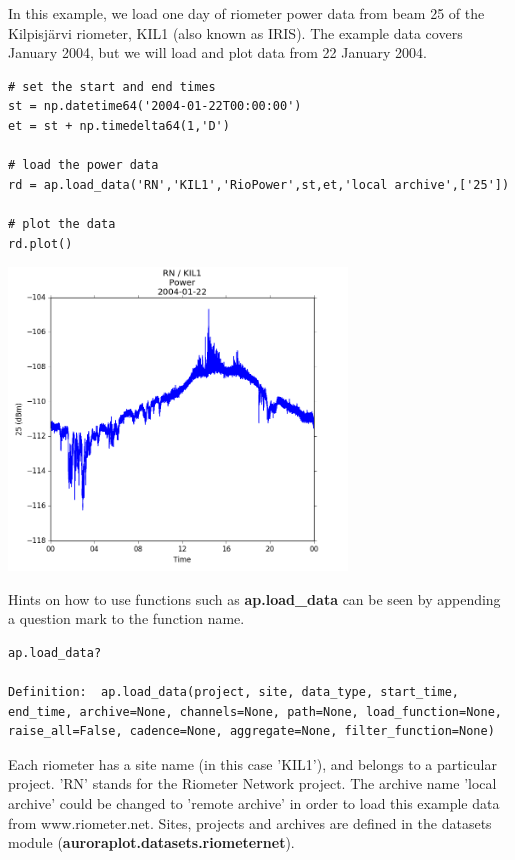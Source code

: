 \documentclass{article}
\begin{document}
In this example, we load one day of riometer power data from beam 25 of the Kilpisj\"arvi riometer, KIL1 (also known as IRIS). The example data covers January 2004, but we will load and plot data from 22 January 2004.

\begin{lstlisting}[style=pythonstyle]
# set the start and end times
st = np.datetime64('2004-01-22T00:00:00')
et = st + np.timedelta64(1,'D')

# load the power data
rd = ap.load_data('RN','KIL1','RioPower',st,et,'local archive',['25'])

# plot the data
rd.plot()
\end{lstlisting}

\begin{center}
\includegraphics[width=9cm]{images/figure_1.png}
\end{center}

\noindent Hints on how to use functions such as {\bf ap.load\_data} can be seen by appending a question mark to the function name.

\begin{lstlisting}[style=pythonstyle]
ap.load_data?

Definition:  ap.load_data(project, site, data_type, start_time, end_time, archive=None, channels=None, path=None, load_function=None, raise_all=False, cadence=None, aggregate=None, filter_function=None)
\end{lstlisting}

Each riometer has a site name (in this case 'KIL1'), and belongs to a particular project. 'RN' stands for the Riometer Network project. The archive name 'local archive' could be changed to 'remote archive' in order to load this example data from www.riometer.net. Sites, projects and archives are defined in the datasets module ({\bf auroraplot.datasets.riometernet}).
\end{document}
